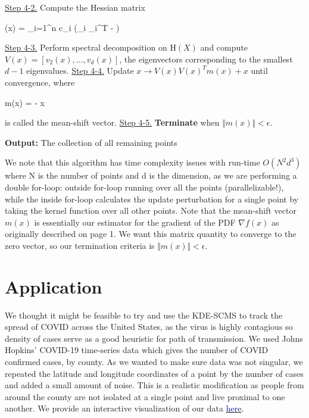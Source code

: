 \documentclass[letterpaper,fleqn]{article}
\theoremstyle{plain}
\theoremstyle{definition}
\newcommand{\1}{\mathds{1}}
\begin{document}
\begin{algorithm}[!htb]
\begin{algorithmic}
\begin{ALC@g}
         \STATE \uline{Step 4-2.} Compute the Hessian matrix
            \begin{flalign*}
                (x) =  \sum_{i=1}^{n} c_i \left(\mu_i \mu_i^{T} - \right)
            \end{flalign*}
            \vspace{-0.75em}
        \STATE \uline{Step 4-3.} Perform spectral decomposition on $\mathrm{H}(X)$ and compute $V(x) = [v_2(x), \dots, v_d(x)]$, the eigenvectors corresponding to the smallest $d-1$ eigenvalues.
        \STATE \uline{Step 4-4.} Update $x \rightarrow V(x)V(x)^{T}m(x) + x$ until convergence, where
            \begin{flalign*}
                m(x) =  - x
            \end{flalign*}
        is called the mean-shift vector.
        \STATE \uline{Step 4-5.} \textbf{Terminate} when $\Vert m(x) \Vert < \epsilon$.
    \end{ALC@g}
\end{algorithmic}
\begin{flushleft}
    \textbf{Output:} The collection of all remaining points\\
\end{flushleft}
\end{algorithm}

We note that this algorithm has time complexity issues with run-time $O(N^2 d^3)$ where N is the number of points and d is the dimension, as we are performing a double for-loop: outside for-loop running over all the points (parallelizable!), while the inside for-loop calculates the update perturbation for a single point by taking the kernel function over all other points. Note that the mean-shift vector $m(x)$ is essentially our estimator for the gradient of the PDF $\nabla f(x)$ as originally described on page 1. We want this matrix quantity to converge to the zero vector, so our termination criteria is $\Vert m(x) \Vert < \epsilon$.

\newpage

\section{Application}

We thought it might be feasible to try and use the KDE-SCMS to track the spread of COVID across the United States, as the virus is highly contagious so density of cases serve as a good heuristic for path of transmission. We used Johns Hopkins' COVID-19 time-series data\cite{covid_data} which gives the number of COVID confirmed cases, by county. As we wanted to make sure data was not singular, we repeated the latitude and longitude coordinates of a point by the number of cases and added a small amount of noise. This is a realistic modification as people from around the county are not isolated at a single point and live proximal to one another. We provide an interactive visualization of our data \href{https://kepler.gl/demo/map?mapUrl=https://dl.dropboxusercontent.com/s/tmpj2dkr0w1vhoj/keplergl_7k43a5f.json}{\textcolor{darkblue}{here}}.
\end{document}
